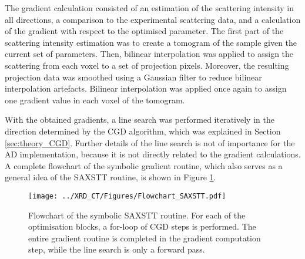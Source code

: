 The gradient calculation consisted of an estimation of the scattering intensity in all directions, a comparison to the experimental scattering data,
and a calculation of the gradient with respect to the optimised parameter.
The first part of the scattering intensity estimation was to create a tomogram of the sample given the current set of parameters.
Then, bilinear interpolation was applied to assign the scattering from each voxel to a set of projection pixels.
Moreover, the resulting projection data was smoothed using a Gaussian filter to reduce bilinear interpolation artefacts.
Bilinear interpolation was applied once again to assign one gradient value in each voxel of the tomogram. %

With the obtained gradients, a line search was performed iteratively in the direction determined by the CGD algorithm, which was explained in Section \ref{sec:theory_CGD}.
Further details of the line search is not of importance for the AD implementation, because it is not directly related to the gradient calculations.
A complete flowchart of the symbolic gradient routine, which also serves as a general idea of the SAXSTT routine, is shown in Figure \ref{fig:flowchart_SAXSTT}.



\begin{figure}
    \centering
    \texttt{[image: ../XRD\_CT/Figures/Flowchart\_SAXSTT.pdf]} %
    \caption{Flowchart of the symbolic SAXSTT routine.
        For each of the optimisation blocks, a for-loop of CGD steps is performed.
        The entire gradient routine is completed in the gradient computation step, while the line search is only a forward pass.
    }
    \label{fig:flowchart_SAXSTT}
\end{figure}

